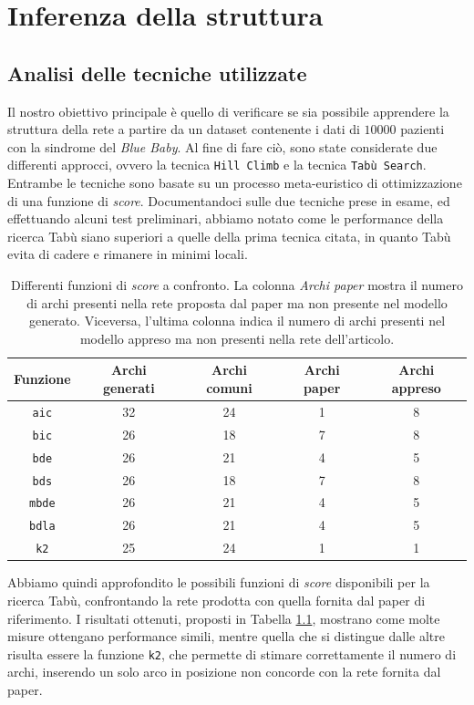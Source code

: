 \chapter{Inferenza della struttura}
\section{Analisi delle tecniche utilizzate}
\label{sec:misure}
Il nostro obiettivo principale è quello di verificare se sia possibile apprendere la struttura della rete a partire da un dataset contenente i dati di $10000$ pazienti con la sindrome del \textit{Blue Baby}. Al fine di fare ciò, sono state considerate due differenti approcci, ovvero la tecnica \texttt{Hill Climb} e la tecnica \texttt{Tabù Search}. Entrambe le tecniche sono basate su un processo meta-euristico di ottimizzazione di una funzione di \textit{score}. Documentandoci sulle due tecniche prese in esame, ed effettuando alcuni test preliminari, abbiamo notato come le performance della ricerca Tabù siano superiori a quelle della prima tecnica citata, in quanto Tabù evita di cadere e rimanere in minimi locali.\\
\begin{table}[t!]
	\centering
	\caption{Differenti funzioni di \textit{score} a confronto. La colonna \textit{Archi paper} mostra il numero di archi presenti nella rete proposta dal paper ma non presente nel modello generato. Viceversa, l'ultima colonna indica il numero di archi presenti nel modello appreso ma non presenti nella rete dell'articolo.}
	\begin{tabular}{|c|c|c|c|c|}
		\hline 
		Funzione & Archi generati  & Archi comuni & Archi paper & Archi appreso \\ 
		\hline 
		\texttt{aic} & 32 & 24 & 1 & 8 \\ 
		\hline 
		\texttt{bic} & 26 & 18 & 7 & 8 \\ 
		\hline 
		\texttt{bde} & 26 & 21 & 4 & 5 \\ 
		\hline 
		\texttt{bds} & 26 & 18 & 7 & 8 \\ 
		\hline 
		\texttt{mbde} & 26 & 21 & 4 & 5 \\ 
		\hline 
		\texttt{bdla} & 26 & 21 & 4 & 5 \\ 
		\hline 
		\texttt{k2} & 25 & 24 & 1 & 1 \\ 
		\hline 
	\end{tabular} 
	\label{tab:score}
\end{table}
Abbiamo quindi approfondito le possibili funzioni di \textit{score} disponibili per la ricerca Tabù, confrontando la rete prodotta con quella fornita dal paper di riferimento. I risultati ottenuti, proposti in Tabella \ref{tab:score}, mostrano come molte misure ottengano performance simili, mentre quella che si distingue dalle altre risulta essere la funzione \texttt{k2}, che permette di stimare correttamente il numero di archi, inserendo un solo arco in posizione non concorde con la rete fornita dal paper.\\
